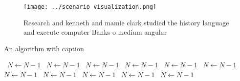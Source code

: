 \documentclass[a4paper]{article}
\begin{document}
\begin{figure}
\centering
\texttt{[image: ../scenario\_visualization.png]}
\caption{Research and kenneth and mamie clark studied the history language and execute computer Banks o medium angular
}
\end{figure}
 
\begin{algorithm}
\caption{An algorithm with caption}
\begin{algorithmic}
\    \State $N \gets N - 1$
\    \State $N \gets N - 1$
\    \State $N \gets N - 1$
\    \State $N \gets N - 1$
\    \State $N \gets N - 1$
\    \State $N \gets N - 1$
\    \State $N \gets N - 1$
\    \State $N \gets N - 1$
\    \State $N \gets N - 1$
\    \State $N \gets N - 1$
\    \State $N \gets N - 1$
\EndWhile
\end{algorithmic}
\end{algorithm}
\end{document}
